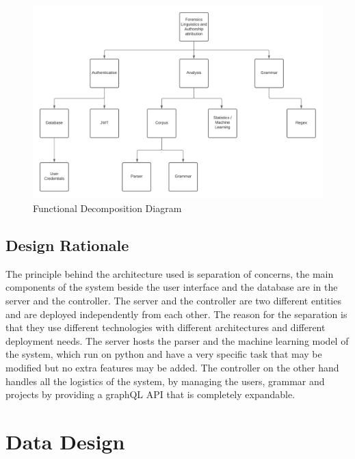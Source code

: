 \begin{figure}[H]
    \includegraphics[width=15cm]{images/FDD.png}
    \caption{Functional Decomposition Diagram}
\end{figure}


\subsection{Design Rationale}
The principle behind the architecture used is separation of concerns, the main components of the system beside the user interface and the database are in the server and the controller. The server and the controller are two different entities and are deployed independently from each other. The reason for the separation is that they use different technologies with different architectures and different deployment needs. The server hosts the parser and the machine learning model of the system, which run on python and have a very specific task that may be modified but no extra features may be added. The controller on the other hand handles all the logistics of the system, by managing the users, grammar and projects by providing a graphQL API that is completely expandable.


\section{Data Design}
